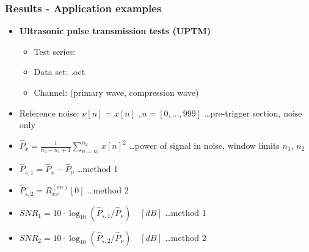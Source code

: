 \documentclass[11pt,aspectratio=169]{beamer}
\newcommand{\RPATH}{../../octave/results/test_acfrn}
\begin{document}
	\begin{frame}
		\frametitle{Results - Application examples}
		
		\begin{itemize}
			\item \textbf{Ultrasonic pulse transmission tests (UPTM)}
			\begin{itemize}
				\item Test series: \cite{ts1ds}
				\item Data set: .oct
				\item Channel:  (primary wave, compression wave)
			\end{itemize}
			\item Reference noise: $\nu[n] = x[n] \; , n = [0,...,999]$ \ldots pre-trigger section, noise only
			\item $\hat{P}_x = \frac{1}{n_2 - n_1 + 1} \sum\limits_{n=n_1}^{n_2} x[n]^2$ \ldots power of signal in noise, window limits $n_1$, $n_2$
			\item $\hat{P}_{s,1} = \hat{P}_x - \hat{P}_{\nu}$ \ldots method 1
			\item $\hat{P}_{s,2} = R_{xx}^{(rn)}[0]$ \ldots method 2
			\item $SNR_1 = 10 \cdot \log_{10} (\hat{P}_{s,1} / \hat{P}_{\nu}) \quad [dB]$ \ldots method 1
			\item $SNR_2 = 10 \cdot \log_{10} (\hat{P}_{s,2} / \hat{P}_{\nu}) \quad [dB]$ \ldots method 2
		\end{itemize}
	\end{frame}
\end{document}
